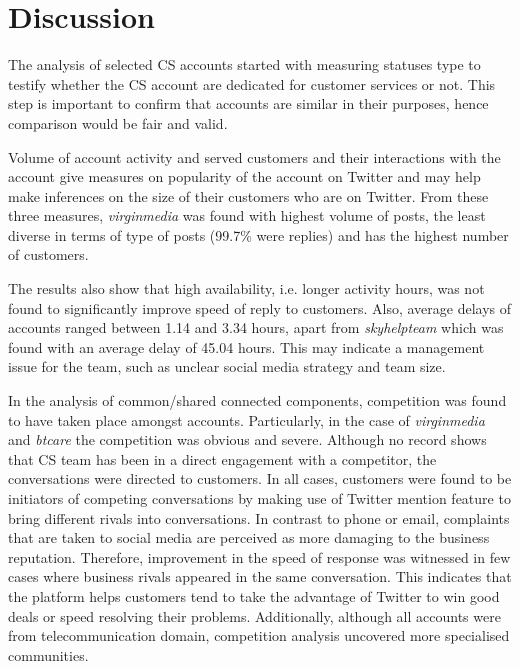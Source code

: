 \documentclass[sigconf]{acmart}
\begin{document}


\section{Discussion}\label{discussion}

The analysis of selected CS accounts started with measuring statuses
type to testify whether the CS account are dedicated for customer
services or not. This step is important to confirm that accounts are
similar in their purposes, hence comparison would be fair and valid.

Volume of account activity and served customers and their interactions
with the account give measures on popularity of the account on Twitter
and may help make inferences on the size of their customers who are on
Twitter. From these three measures, {\emph{virginmedia}} was found with
highest volume of posts, the least diverse in terms of type of posts
(99.7\% were replies) and has the highest number of customers.

The results also show that high availability, i.e. longer activity
hours, was not found to significantly improve speed of reply to
customers. Also, average delays of accounts ranged between 1.14 and
3.34 hours, apart from {\emph{skyhelpteam}} which was found with an average
delay of 45.04 hours. This may indicate a management issue for the
team, such as unclear social media strategy and team size. 

In the analysis of common/shared connected components, competition was
found to have taken place amongst accounts. Particularly, in the case
of {\emph{virginmedia}} and {\emph{btcare}} the competition was
obvious and severe. Although no record shows that CS team has been in
a direct engagement with a competitor, the conversations were directed
to customers. In all cases, customers were found to be initiators of
competing conversations by making use of Twitter mention feature to
bring different rivals into conversations. In contrast to phone or
email, complaints that are taken to social media are perceived as more
damaging to the business reputation. Therefore, improvement in the
speed of response was witnessed in few cases where business rivals
appeared in the same conversation. This indicates that the platform
helps customers tend to take the advantage of Twitter to win good
deals or speed resolving their problems. Additionally, although all
accounts were from telecommunication domain, competition analysis
uncovered more specialised communities.
\end{document}
